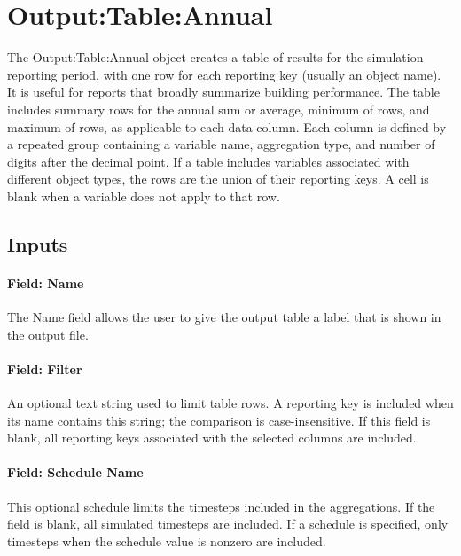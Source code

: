 \section{Output:Table:Annual}\label{outputtableannual}

The Output:Table:Annual object creates a table of results for the simulation reporting period, with one row for each reporting key (usually an object name). It is useful for reports that broadly summarize building performance. The table includes summary rows for the annual sum or average, minimum of rows, and maximum of rows, as applicable to each data column. Each column is defined by a repeated group containing a variable name, aggregation type, and number of digits after the decimal point. If a table includes variables associated with different object types, the rows are the union of their reporting keys. A cell is blank when a variable does not apply to that row.

\subsection{Inputs}\label{inputs-062}

\paragraph{Field: Name}\label{field-name-060}

The Name field allows the user to give the output table a label that is shown in the output file.

\paragraph{Field: Filter}\label{field-filter}

An optional text string used to limit table rows. A reporting key is included when its name contains this string; the comparison is case-insensitive. If this field is blank, all reporting keys associated with the selected columns are included.

\paragraph{Field: Schedule Name}\label{field-schedule-name-008}

This optional schedule limits the timesteps included in the aggregations. If the field is blank, all simulated timesteps are included. If a schedule is specified, only timesteps when the schedule value is nonzero are included.

